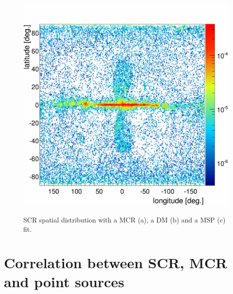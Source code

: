 \begin{figure}[h]
\begin{minipage}[h]{0.4\textwidth}
	  \label{}
  \end{minipage}
  \hfill
  \begin{minipage}[h]{0.4\textwidth}
	  \centering
	  \includegraphics[width=1.\linewidth]{pic/discussion/MSPonly_fine_SCR_integral_distribution.png}
	  \label{}
  \end{minipage}
  \caption[SCR spatial distributions.]{SCR spatial distribution with a MCR (a), a DM (b) and a MSP (c) fit.}
  \label{fig:SCR_flux_distrib_excess_comp}	 
\end{figure}

\newpage
\section{Correlation between SCR, MCR and point sources}

